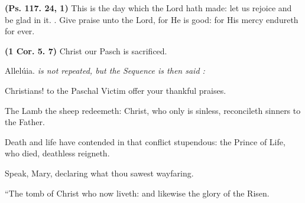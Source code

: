 \documentclass[11pt]{article} %
\begin{document}


\textbf{(Ps. 117. 24, 1)} This is the day which the Lord hath made: let us rejoice and be glad in it. \Vbar{}. Give praise unto the Lord, for He is good: for His mercy endureth for ever.

\vskip20pt

\def\greinitialformat#1{%
{\fontsize{34}{34}\selectfont #1}%
}




\textbf{(1 Cor. 5. 7)} Christ our Pasch is sacrificed.

Allelúia. \emph{is not repeated, but the Sequence is then said :}
\vskip10pt

\def\greinitialformat#1{%
{\fontsize{34}{34}\selectfont #1}%
}




Christians! to the Paschal Victim offer your thankful praises.

The Lamb the sheep redeemeth: Christ, who only is sinless, reconcileth sinners to the Father.

Death and life have contended in that conflict stupendous: the Prince of Life, who died, deathless reigneth.

Speak, Mary, declaring what thou sawest wayfaring.

``The tomb of Christ who now liveth: and likewise the glory of the Risen.
\end{document}
